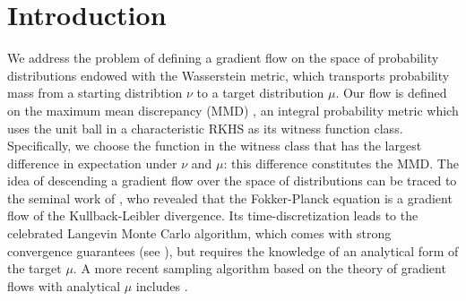 \section{Introduction}




We address the problem of defining a gradient flow  on the space of probability distributions endowed with the Wasserstein metric, which transports probability mass from a starting distribtion $\nu$ to a target distribution $\mu$.   Our flow is defined on the maximum mean discrepancy (MMD) \cite{gretton2012kernel}, an integral probability metric \cite{Mueller97} which uses the unit ball in a characteristic RKHS \cite{sriperumbudur2010hilbert} as its witness function class.
Specifically, we choose the function in the witness class that has the largest difference in expectation under $\nu$ and $\mu$: this difference constitutes the MMD.
The idea of descending a gradient flow over the space of distributions can be traced to the seminal work of \cite{jordan1998variational}, who revealed that the Fokker-Planck equation is a gradient flow of the Kullback-Leibler divergence. Its time-discretization leads to the celebrated Langevin Monte Carlo algorithm, which comes with strong convergence guarantees  (see \cite{durmus2018analysis}), but requires the knowledge of an analytical form of the target $\mu$.  A more recent sampling algorithm based on the theory of gradient flows with analytical $\mu$ includes \cite{liu2017stein}.







